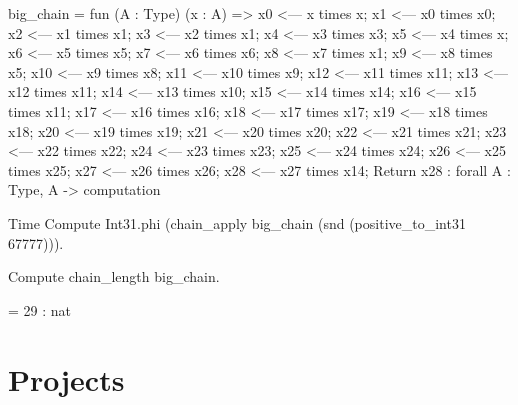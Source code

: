 \begin{Coqanswer}
big_chain = 
fun (A : Type) (x : A) =>
x0 <--- x times x; x1 <--- x0 times x0;
x2 <--- x1 times x1; x3 <--- x2 times x1;
x4 <--- x3 times x3; x5 <--- x4 times x;
x6 <--- x5 times x5; x7 <--- x6 times x6;
x8 <--- x7 times x1; x9 <--- x8 times x5;
x10 <--- x9 times x8; x11 <--- x10 times x9;
x12 <--- x11 times x11; x13 <--- x12 times x11;
x14 <--- x13 times x10; x15 <--- x14 times x14;
x16 <--- x15 times x11; x17 <--- x16 times x16;
x18 <--- x17 times x17; x19 <--- x18 times x18;
x20 <--- x19 times x19; x21 <--- x20 times x20;
x22 <--- x21 times x21; x23 <--- x22 times x22;
x24 <--- x23 times x23; x25 <--- x24 times x24; 
x26 <--- x25 times x25; x27 <--- x26 times x26; 
x28 <--- x27 times x14;  Return x28
     : forall A : Type, A -> computation

\end{Coqanswer}

\begin{Coqsrc}
Time   Compute  Int31.phi 
     (chain_apply big_chain (snd (positive_to_int31  67777))).
\end{Coqsrc}
\begin{Coqanswer}
= 2014111041%
     : Z
Finished transaction in 0.005 secs (0.005u,0.s) (successful)}  
\end{Coqanswer}

\begin{Coqsrc}
Compute chain_length big_chain.
\end{Coqsrc}

\begin{Coqanswer}
= 29%
     : nat  
\end{Coqanswer}


\section{Projects}

